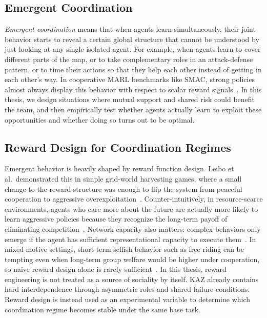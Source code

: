 \subsection{Emergent Coordination}
\emph{Emergent coordination} means that when agents learn simultaneously, their joint behavior starts to reveal a certain global structure that cannot be understood by just looking at any single isolated agent. For example, when agents learn to cover different parts of the map, or to take complementary roles in an attack-defense pattern, or to time their actions so that they help each other instead of getting in each other's way. 
In cooperative MARL benchmarks like SMAC, strong policies almost always display this behavior with respect to scalar reward signals~\cite{yu2021mappo,rashid2018qmix}. In this thesis, we design situations where mutual support and shared risk could benefit the team, and then empirically test whether agents actually learn to exploit these opportunities and whether doing so turns out to be optimal.

\subsection{Reward Design for Coordination Regimes}
\label{subsec:reward}
Emergent behavior is heavily shaped by reward function design. Leibo et al.\ demonstrated this in simple grid-world harvesting games, where a small change to the reward structure was enough to flip the system from peaceful cooperation to aggressive overexploitation~\cite{leibo2017ssd}. Counter-intuitively, in resource-scarce environments, agents who care more about the future are actually more likely to learn aggressive policies because they recognize the long-term payoff of eliminating competition~\cite{leibo2017ssd}. Network capacity also matters: complex behaviors only emerge if the agent has sufficient representational capacity to execute them~\cite{leibo2017ssd}. In mixed-motive settings, short-term selfish behavior such as free riding can be tempting even when long-term group welfare would be higher under cooperation, so naive reward design alone is rarely sufficient~\cite{leibo2017ssd, albrecht2024marl}.
In this thesis, reward engineering is not treated as a source of sociality by itself. KAZ already contains hard interdependence through asymmetric roles and shared failure conditions. Reward design is instead used as an experimental variable to determine which coordination regime becomes stable under the same base task.

